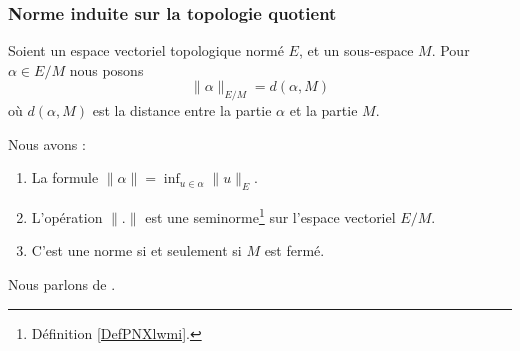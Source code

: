 \subsubsection{Norme induite sur la topologie quotient}

\begin{propositionDef}       \label{PROPooDUAVooEfrEGI}
	Soient un espace vectoriel topologique normé \( E\), et un sous-espace \( M\). Pour \( \alpha\in E/M\) nous posons
	\begin{equation}
		\| \alpha \|_{E/M}=d(\alpha,M)
	\end{equation}
	où \( d(\alpha,M)\) est la distance entre la partie \( \alpha\) et la partie \( M\).

	Nous avons :
	\begin{enumerate}
		\item       \label{ITEMooQOZXooZiZdTn}
		      La formule \( \| \alpha \|=\inf_{u\in \alpha}\| u \|_E\).
		\item       \label{ITEMooFEOGooTTDgCj}
		      L'opération \( \| . \|\) est une seminorme\footnote{Définition \ref{DefPNXlwmi}.} sur l'espace vectoriel \( E/M\).
		\item       \label{ITEMooWCCSooMeqQHL}
		      C'est une norme si et seulement si \( M\) est fermé.
	\end{enumerate}
	Nous parlons de .
\end{propositionDef}

